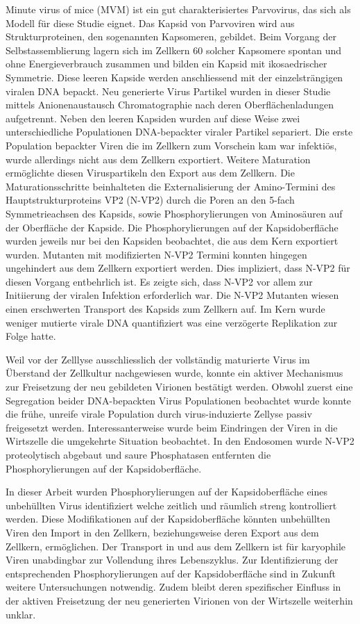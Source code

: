 Minute virus of mice (MVM) ist ein gut charakterisiertes Parvovirus, das sich als Modell für diese Studie eignet. Das Kapsid von Parvoviren wird aus Strukturproteinen, den sogenannten Kapsomeren, gebildet. Beim Vorgang der Selbstassemblierung lagern sich im Zellkern 60 solcher Kapsomere spontan und ohne Energieverbrauch zusammen und bilden ein Kapsid mit ikosaedrischer Symmetrie. Diese leeren Kapside werden anschliessend mit der einzelsträngigen viralen DNA bepackt. Neu generierte Virus Partikel wurden in dieser Studie mittels A\-ni\-o\-nen\-aus\-tausch Chromatographie nach deren Oberflächenladungen aufgetrennt. Neben den leeren Kapsiden wurden auf diese Weise zwei unterschiedliche Populationen DNA-bepackter viraler Partikel separiert. Die erste Population bepackter Viren die im Zellkern zum Vorschein kam war infektiös, wurde allerdings nicht aus dem Zellkern exportiert. Weitere Maturation ermöglichte diesen Viruspartikeln den Export aus dem Zellkern. Die Maturationsschritte beinhalteten die Externalisierung der Amino-Termini des Hauptstrukturproteins VP2 (N-VP2) durch die Poren an den 5-fach Symmetrieachsen des Kapsids, sowie Phosphorylierungen von Aminosäuren auf der Oberfläche der Kapside. Die Phosphorylierungen auf der Kapsidoberfläche wurden jeweils nur bei den Kapsiden beobachtet, die aus dem Kern exportiert wurden. Mutanten mit modifizierten N-VP2 Termini konnten hingegen ungehindert aus dem Zellkern exportiert werden. Dies impliziert, dass N-VP2 für diesen Vorgang entbehrlich ist. Es zeigte sich, dass N-VP2 vor allem zur Initiierung der viralen Infektion erforderlich war. Die N-VP2 Mutanten wiesen einen erschwerten Transport des Kapsids zum Zellkern auf. Im Kern wurde weniger mutierte virale DNA quantifiziert was eine verzögerte Replikation zur Folge hatte. 

Weil vor der Zelllyse ausschliesslich der vollständig maturierte Virus im Überstand der Zellkultur nachgewiesen wurde, konnte ein aktiver Mechanismus zur Freisetzung der neu gebildeten Virionen bestätigt werden. Obwohl zuerst eine Segregation beider DNA-bepackten Virus Populationen beobachtet wurde konnte die frühe, unreife virale Population durch virus-induzierte Zellyse passiv freigesetzt werden. Interessanterweise wurde beim Eindringen der Viren in die Wirtszelle die umgekehrte Situation beobachtet. In den Endosomen wurde N-VP2 proteolytisch abgebaut und saure Phosphatasen entfernten die Phosphorylierungen auf der Kapsidoberfläche. 

In dieser Arbeit wurden Phosphorylierungen auf der Kapsidoberfläche eines unbehüllten Virus identifiziert welche zeitlich und räumlich streng kontrolliert werden. Diese Modifikationen auf der Kapsidoberfläche könnten unbehüllten Viren den Import in den Zellkern, beziehungsweise deren Export aus dem Zellkern, ermöglichen. Der Transport in und aus dem Zellkern ist für karyophile Viren unabdingbar zur Vollendung ihres Lebenszyklus. Zur Identifizierung der entsprechenden Phosphorylierungen auf der Kapsidoberfläche sind in Zukunft weitere Untersuchungen notwendig. Zudem bleibt deren spezifischer Einfluss in der aktiven Freisetzung der neu generierten Virionen von der Wirtszelle weiterhin unklar.
